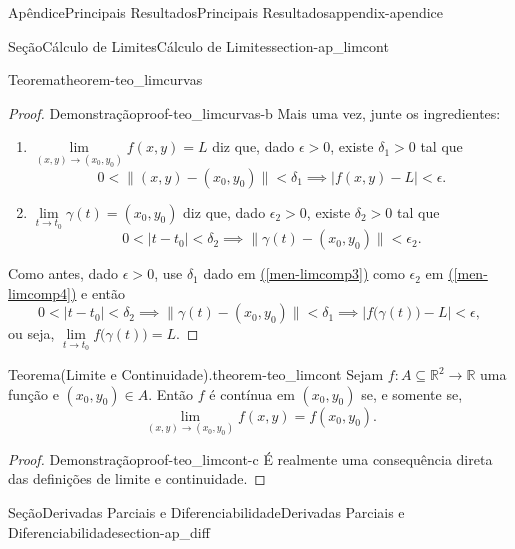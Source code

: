 \documentclass[oneside,10pt,]{book}
\newcommand{\xreffont}{\relax}
\numberwithin{equation}{section}
\newcommand{\R}{\mathbb R}
\begin{document}
\begin{appendixptx}{Apêndice}{Principais Resultados}{}{Principais Resultados}{}{}{appendix-apendice}
\begin{sectionptx}{Seção}{Cálculo de Limites}{}{Cálculo de Limites}{}{}{section-ap_limcont}
\begin{theorem}{Teorema}{}{}{theorem-teo_limcurvas}
\end{theorem}
\begin{proof}{Demonstração}{}{proof-teo_limcurvas-b}
Mais uma vez, junte os ingredientes:%
\begin{enumerate}
\item{}\(\lim\limits_{(x,y)\to(x_0,y_0)} f(x,y)=L\) diz que, dado \(\epsilon>0\), existe \(\delta_1>0\) tal que%
\begin{equation}
0<\|(x,y)-(x_0,y_0)\|<\delta_1\implies
|f(x,y)-L|<\epsilon.\label{men-limcomp3}
\end{equation}
%
\item{}\(\lim\limits_{t\to t_0} \gamma(t)=(x_0,y_0)\) diz que, dado \(\epsilon_2>0\), existe \(\delta_2>0\) tal que%
\begin{equation}
0<|t-t_0|<\delta_2\implies
\|\gamma(t)-(x_0,y_0)\|<\epsilon_2.\label{men-limcomp4}
\end{equation}
%
\end{enumerate}
%
\par
Como antes, dado \(\epsilon>0\), use \(\delta_1\) dado em \hyperref[men-limcomp3]{({\xreffont\ref{men-limcomp3}})} como \(\epsilon_2\) em \hyperref[men-limcomp4]{({\xreffont\ref{men-limcomp4}})} e então%
\begin{equation*}
0<|t-t_0|<\delta_2\implies \|\gamma(t)-(x_0,y_0)\|<
\delta_1\implies |f\big(\gamma(t)\big)-L|<\epsilon,
\end{equation*}
ou seja, \(\lim\limits_{t\to t_0} f\big(\gamma(t)\big)=L\).%
\end{proof}
\begin{theorem}{Teorema}{(Limite e Continuidade).}{}{theorem-teo_limcont}%
Sejam \(f\colon A\subseteq\R^2\to\R\) uma função e \((x_0,y_0)\in A\). Então \(f\) é contínua em \((x_0,y_0)\) se, e somente se,%
\begin{equation*}
\lim\limits_{(x,y)\to(x_0,y_0)} f(x,y)=f(x_0,y_0).
\end{equation*}
%
\end{theorem}
\begin{proof}{Demonstração}{}{proof-teo_limcont-c}
É realmente uma consequência direta das definições de limite e continuidade.%
\end{proof}
\end{sectionptx}
%
%
\typeout{************************************************}
\typeout{************************************************}
%
\begin{sectionptx}{Seção}{Derivadas Parciais e Diferenciabilidade}{}{Derivadas Parciais e Diferenciabilidade}{}{}{section-ap_diff}

\end{sectionptx}
\end{appendixptx}
\end{document}
